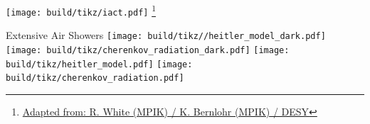 \begin{frame}
  \centering
  \texttt{[image: build/tikz/iact.pdf]}
  \footnote{\href{https://www.flickr.com/photos/cta_observatory/45643242354/in/photostream/}{\textcolor{white!85!black}{Adapted from: R. White (MPIK) / K. Bernlohr (MPIK) / DESY}}}
\end{frame}

\begin{frame}{Extensive Air Showers}
    {%
    \texttt{[image: build/tikz//heitler\_model\_dark.pdf]}
    \texttt{[image: build/tikz/cherenkov\_radiation\_dark.pdf]}
    }
    {%
    \texttt{[image: build/tikz/heitler\_model.pdf]}
    \texttt{[image: build/tikz/cherenkov\_radiation.pdf]}
    }
\end{frame}


